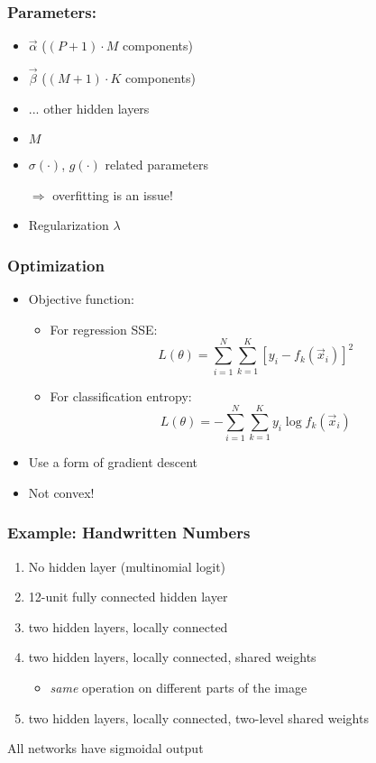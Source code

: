 \documentclass[mathserif]{beamer}
\begin{document}
\begin{frame}
  \frametitle{Parameters:}
  \begin{itemize}
  \item $\vec{\alpha}$ ($(P + 1) \cdot M$ components)
  \item $\vec{\beta}$ ($(M + 1) \cdot K$ components)
  \item ... other hidden layers
  \item $M$
  \item $\sigma(\cdot)$, $g(\cdot)$ related parameters
  \item[$\Rightarrow$] overfitting is an issue!
  \item Regularization $\lambda$
  \end{itemize}
\end{frame}

\begin{frame}
  \frametitle{Optimization}
  \begin{itemize}
  \item Objective function:
    \begin{itemize}
    \item For regression SSE:
      \begin{equation*}
        L(\theta) =
        \sum_{i=1}^{N} \sum_{k=1}^{K} [ y_{i} - f_{k} (\vec{x}_{i}) ]^{2}
      \end{equation*}
    \item For classification entropy:
      \begin{equation*}
        L(\theta) =
        - \sum_{i=1}^{N} \sum_{k=1}^{K} y_{i} \log f_{k} (\vec{x}_{i})
      \end{equation*}
    \end{itemize}
  \item Use a form of gradient descent
  \item Not convex!
  \end{itemize}
\end{frame}

\begin{frame}
  \frametitle{Example: Handwritten Numbers}
  \begin{enumerate}
  \item No hidden layer (multinomial logit)
  \item 12-unit fully connected hidden layer
  \item two hidden layers, locally connected
  \item two hidden layers, locally connected, shared weights
    \begin{itemize}
    \item \emph{same} operation on different parts of the image
    \end{itemize}
  \item two hidden layers, locally connected, two-level shared weights
  \end{enumerate}
  All networks have sigmoidal output
\end{frame}
\end{document}
